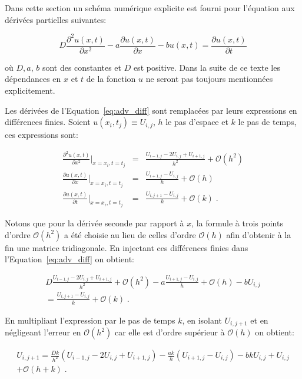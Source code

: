 \documentclass[a4paper, 12pt]{report}
\begin{document}
Dans cette section un schéma numérique explicite est fourni pour l'équation
aux dérivées partielles suivantes:

\begin{equation}
D \frac{\partial^2 u(x,t)}{\partial x^2} - a \frac{\partial u(x,t)}{\partial x} - b u(x,t) = \frac{\partial u(x,t)}{\partial t}
\label{eq:adv_diff}
\end{equation}

où $D, a$, $b$ sont des constantes et $D$ est positive. Dans la suite de ce texte les dépendances en $x$ et $t$
de la fonction $u$ ne seront pas toujours mentionnées explicitement.

Les dérivées de l'Equation~\ref{eq:adv_diff} sont remplacées par leurs expressions
en différences finies. Soient $u(x_i, t_j) \equiv U_{i,j}$, $h$ le pas d'espace
et $k$ le pas de temps, ces expressions sont:

\begin{align}
  \frac{\partial^2 u (x,t)}{\partial x^2} \biggr |_{x=x_i, t=t_j} &=& \frac{U_{i-1,j} - 2 U_{i,j} + U_{i+1,j}}{h^2} + \mathcal{O}(h^2)\\
  \frac{\partial u (x,t)}{\partial x} \biggr |_{x=x_i, t=t_j} &=& \frac{U_{i+1,j} - U_{i,j}}{h} + \mathcal{O}(h)\\
  \frac{\partial u (x,t)}{\partial t} \biggr |_{x=x_i, t=t_j} &=& \frac{U_{i,j+1} - U_{i,j}}{k} + \mathcal{O}(k) \;.
\end{align}

Notons que pour la dérivée seconde par rapport à $x$, la formule à trois points d'ordre $\mathcal{O}(h^2)$ a été choisie
au lieu de celles d'ordre $\mathcal{O}(h)$ afin d'obtenir à la fin une matrice
tridiagonale. En injectant ces différences finies dans l'Equation~\ref{eq:adv_diff}
on obtient:

\begin{multline}
D \frac{U_{i-1,j} - 2 U_{i,j} + U_{i+1,j}}{h^2} + \mathcal{O}(h^2) - a \frac{U_{i+1,j} - U_{i,j}}{h} + \mathcal{O}(h) - b U_{i,j}\\
= \frac{U_{i,j+1} - U_{i,j}}{k} + \mathcal{O}(k) \;.
\end{multline}

En multipliant l'expression par le pas de temps $k$, en isolant $U_{i,j+1}$ et
en négligeant l'erreur en $\mathcal{O}(h^2)$ car elle est d'ordre supérieur à $\mathcal{O}(h)$
on obtient:

\begin{multline}
  U_{i,j+1} = \frac{Dk}{h^2} (U_{i-1,j} - 2 U_{i,j} + U_{i+1,j}) - \frac{ak}{h} (U_{i+1,j} - U_{i,j}) - bk U_{i,j} + U_{i,j}\\
  + \mathcal{O}(h+k) \;.
\end{multline}
\end{document}
